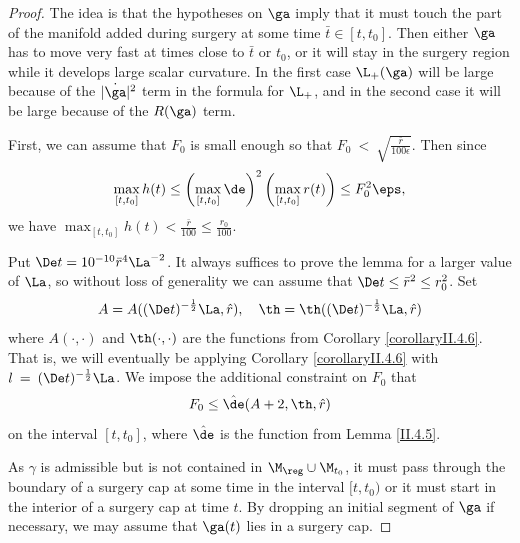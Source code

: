\begin{proof}
The idea is that the hypotheses on  $\ga$  imply that it must touch the
part of the manifold added during surgery at some time $\bar t\in[t,t_0]$.
Then either $\ga$ has to move very fast at times close to $\bar t$ or
$t_0$, or it
will stay in the surgery region while it develops large
scalar curvature. In the first case $\L_+(\ga)$ will be large because
of the $|\dot{\ga}|^2$ term in the formula for $\L_+$,
and in the second case it will be large because of
the $R(\ga)$ term.

First, we can assume that $F_0$ is small enough so that
$F_0 \: < \: \sqrt{\frac{\bar r}{100 \epsilon}}$.
Then since
\begin{equation}
\label{h<<r}
\max_{[t,t_0]}h(t)\leq \left(\max_{[t,t_0]}\de\right)^2
\left(\max_{[t,t_0]}r(t)\right)\leq F_0^2\eps,
\end{equation}
we have $\max_{[t,t_0]}h(t)
<\frac{\bar r}{100}\leq  \frac{r_0}{100}$.

Put
$\De t=10^{-10} \bar r^4\La^{-2}$.
It always suffices to prove
the lemma for a larger value of $\La$,
so without loss of generality we can assume that
$\De t\leq \bar r^2\leq r_0^2$. Set
\begin{equation}
\label{aandthetaconditions}
A=A((\De t)^{-\frac12}\La,\hat r),\quad
\th=\th((\De t)^{-\frac12}\La,\hat r)
\end{equation}
where $A(\cdot,\cdot)$ and $\th(\cdot,\cdot)$
are  the functions from Corollary \ref{corollaryII.4.6}.
That is, we will eventually be applying Corollary \ref{corollaryII.4.6}
with $l \: = \: (\De t)^{-\frac12}\La$.
We impose the additional constraint on $F_0$ that
\begin{equation}
\label{deltasmall}
 F_0\leq \hat\de(A+2,\th,\hat r)
\end{equation}
on the interval $[t, t_0]$,
where $\hat\de $ is the function from Lemma \ref{II.4.5}.

As $\gamma$ is admissible but is not contained in $\M_{\reg}\cup\M_{t_0}$,
it must pass through the boundary of a surgery cap at some time
in the interval $[t, t_0)$ or it must start in the interior of a
surgery cap at time $t$.
By dropping an initial segment of $\ga$
if necessary, we may assume that $\ga(t)$ lies in a
surgery cap.


\end{proof}
